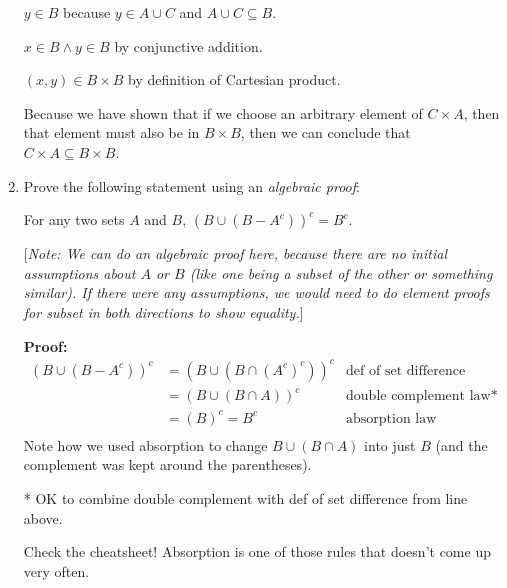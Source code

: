 \documentclass[11pt, letterpaper]{report}
\newcommand{\proofnote}[1]{[\textit{Note: #1}]}
\begin{document}
\begin{enumerate}
        $y \in B$ because $y \in A \cup C$ and $A\cup C \subseteq B$.
        
        $x \in B \land y \in B$ by conjunctive addition.
        
        $(x,y) \in B \times B$ by definition of Cartesian product.
        
        
        
        
        Because we have shown that if we choose an arbitrary element of $C \times A$,
        then that element must also be in $B \times B$, then we can conclude that
        $C \times A \subseteq B \times B$.
        

  \item Prove the following statement using an \textit{algebraic proof}:
        
        For any two sets $A$ and $B$, $(B \cup (B-A^c))^c = B^c$.
      
           
        
        \proofnote{We can do an algebraic proof here, because there are no initial 
        assumptions about $A$ or $B$ (like one being a subset
        of the other or something similar).  If there were any assumptions, we would need to do element proofs for subset in both directions to show equality.}
        
        
        \textbf{Proof:}
        \begin{align*}
                (B \cup (B-A^c))^c &= (B \cup (B \cap (A^{c})^c))^c & \text{def of set difference} \\
                &= (B \cup (B \cap A))^c & \text{double complement law*} \\
                &= (B)^c = B^c & \text{absorption law} \\
        \end{align*}
        Note how we used absorption to change $B \cup (B \cap A)$ into just $B$ (and the
        complement was kept around the parentheses).
        
        * OK to combine double complement with def of set difference from line above.
        
        Check the cheatsheet!  Absorption is one of those rules that doesn't come up very often.
        

\end{enumerate}
\end{document}
